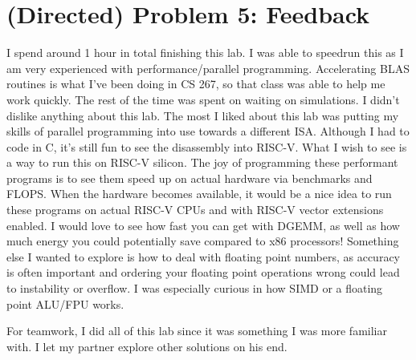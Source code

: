 \documentclass[11pt]{article}
\begin{document}
\newpage
\section*{(Directed) Problem 5: Feedback}
I spend around 1 hour in total finishing this lab. I was able to speedrun this as I am very experienced with performance/parallel programming. Accelerating BLAS routines is what I've been doing in CS 267, so that class was able to help me work quickly. The rest of the time was spent on waiting on simulations. I didn't dislike anything about this lab. The most I liked about this lab was putting my skills of parallel programming into use towards a different ISA. Although I had to code in C, it's still fun to see the disassembly into RISC-V. What I wish to see is a way to run this on RISC-V silicon. The joy of programming these performant programs is to see them speed up on actual hardware via benchmarks and FLOPS. When the hardware becomes available, it would be a nice idea to run these programs on actual RISC-V CPUs and with RISC-V vector extensions enabled. I would love to see how fast you can get with DGEMM, as well as how much energy you could potentially save compared to x86 processors! Something else I wanted to explore is how to deal with floating point numbers, as accuracy is often important and ordering your floating point operations wrong could lead to instability or overflow. I was especially curious in how SIMD or a floating point ALU/FPU works.

For teamwork, I did all of this lab since it was something I was more familiar with. I let my partner explore other solutions on his end.
\end{document}
